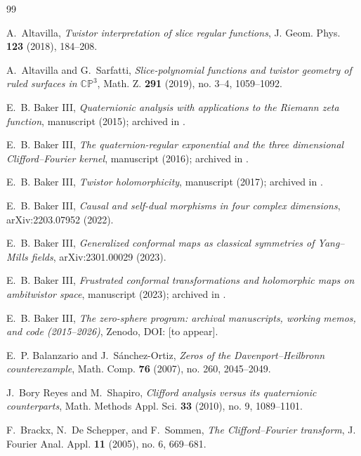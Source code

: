 \documentclass[11pt]{amsart}
\theoremstyle{plain}
\theoremstyle{definition}
\theoremstyle{remark}
\begin{document}
\begin{thebibliography}{99}

A.~Altavilla,
\emph{Twistor interpretation of slice regular functions},
J. Geom. Phys. \textbf{123} (2018), 184--208.

A.~Altavilla and G.~Sarfatti,
\emph{Slice-polynomial functions and twistor geometry of ruled surfaces in $\mathbb{CP}^3$},
Math. Z. \textbf{291} (2019), no. 3--4, 1059--1092.

E.~B. Baker III,
\emph{Quaternionic analysis with applications to the Riemann zeta function},
manuscript (2015); archived in \cite{ZenodoArchive}.

E.~B. Baker III,
\emph{The quaternion-regular exponential and the three dimensional Clifford--Fourier kernel},
manuscript (2016); archived in \cite{ZenodoArchive}.

E.~B. Baker III,
\emph{Twistor holomorphicity},
manuscript (2017); archived in \cite{ZenodoArchive}.

E.~B. Baker III,
\emph{Causal and self-dual morphisms in four complex dimensions},
arXiv:2203.07952 (2022).

E.~B. Baker III,
\emph{Generalized conformal maps as classical symmetries of Yang--Mills fields},
arXiv:2301.00029 (2023).

E.~B. Baker III,
\emph{Frustrated conformal transformations and holomorphic maps on ambitwistor space},
manuscript (2023); archived in \cite{ZenodoArchive}.

E.~B. Baker III,
\emph{The zero-sphere program: archival manuscripts, working memos, and code (2015--2026)},
Zenodo, DOI: [to appear].

E.~P. Balanzario and J.~S\'anchez-Ortiz,
\emph{Zeros of the Davenport--Heilbronn counterexample},
Math. Comp. \textbf{76} (2007), no. 260, 2045--2049.

J.~Bory Reyes and M.~Shapiro,
\emph{Clifford analysis versus its quaternionic counterparts},
Math. Methods Appl. Sci. \textbf{33} (2010), no. 9, 1089--1101.

F.~Brackx, N.~De Schepper, and F.~Sommen,
\emph{The Clifford--Fourier transform},
J. Fourier Anal. Appl. \textbf{11} (2005), no. 6, 669--681.


\end{thebibliography}
\end{document}
